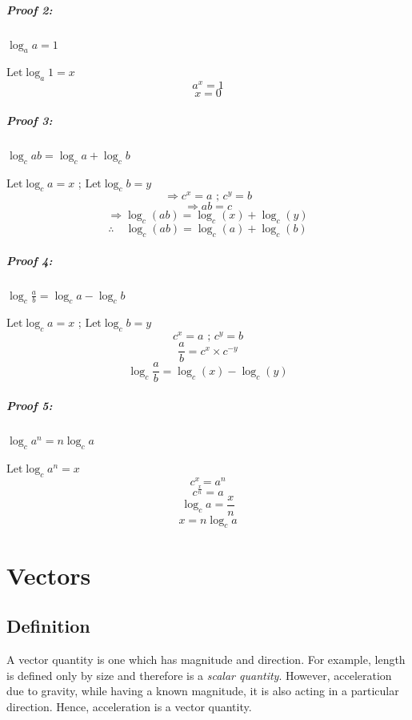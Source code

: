 \documentclass[12pt, a4paper]{report}
\theoremstyle{definition}
\begin{document}
	\paragraph{Proof 2: }$\log_aa  = 1$
	\begin{center}
		$	\text{Let} \log_a1 = x$
		$$   a^x      = 1 $$
		$$x        = 0$$
	\end{center}
	\paragraph{Proof 3: }$\log_cab  = \log_ca + \log_cb$
	\begin{center}
		$	\text{Let} \log_ca = x$ ; $\text{Let} \log_cb = y$
		$$\Rightarrow  c^{x} = a  \text{ ; } c^{y} = b$$
		$$\Rightarrow ab = c $$
		$$\Rightarrow\log_c(ab) = \log_c(x) + \log_c(y)$$
		$$\therefore\quad \log_c(ab) = \log_c(a) + \log_c(b)$$
	\end{center}
	\paragraph{Proof 4: }$\log_c\frac{a}{b}  = \log_ca - \log_cb$
	\begin{center}
		$	\text{Let} \log_ca = x$ ; $\text{Let} \log_cb = y$
		$$  c^{x} = a  \text{ ; } c^{y} = b$$
		$$\frac{a}{b} = c^x \times c^{-y} $$
		$$\log_c\frac{a}{b} = \log_c(x) - \log_c(y)$$
	\end{center}
	\paragraph{Proof 5: }$\log_ca^n = n\log_ca$
	\begin{center}
		$	\text{Let} \log_ca^n = x$
		$$ c^x = a^n$$
		$$c^{\frac{x}{n}} = a  $$
		$$\log_ca = \frac{x}{n}$$
		$$x = n\log_ca $$
	\end{center}
	\chapter{Vectors}
	\section{Definition}
	\quad A vector quantity is one which has magnitude and direction. For example, length is defined only by size and therefore is a \textit{scalar quantity}. However, acceleration due to gravity, while having a known magnitude, it is also acting in a particular direction. Hence, acceleration is a vector quantity.
		
\end{document}
